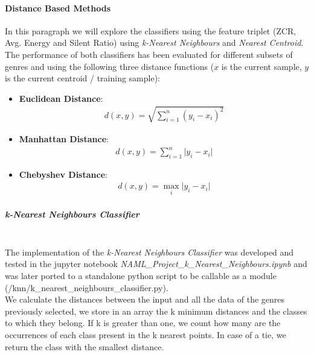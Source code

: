 \documentclass[12pt]{article}
\begin{document}
	\paragraph{Distance Based Methods}
	In this paragraph we will explore the classifiers using the feature triplet (ZCR, Avg. Energy and Silent Ratio) using \textit{k-Nearest Neighbours} and \textit{Nearest Centroid}. The performance of both classifiers has been evaluated for different subsets of genres and using the following three distance functions ($\mathit{x}$ is the current sample, $\mathit{y}$ is the current centroid / training sample):
	\begin{itemize}
		\item \textbf{Euclidean Distance}:\\
		\begin{align}
			d(x,y)=\sqrt{\sum_{i=1}^n{(y_i-x_i)^2}}
		\end{align}
		\item \textbf{Manhattan Distance}:\\
		\begin{align}
			d(x,y)=\sum_{i=1}^n{\big|y_i-x_i\big|}
		\end{align}
		\item \textbf{Chebyshev Distance}:\\
		\begin{align}
			d(x,y)=\max_i{\big|y_i-x_i\big|}
		\end{align}
	\end{itemize}
	\mbox{}\newpage
	\subparagraph{k-Nearest Neighbours Classifier}\mbox{}\\\newline
	The implementation of the \textit{k-Nearest Neighbours Classifier} was developed and tested in the jupyter notebook \textit{NAML\_Project\_k\_Nearest\_Neighbours.ipynb} and was later ported to a standalone python script to be callable as a module (/knn/k\_nearest\_neighbours\_classifier.py).\\
	We calculate the distances between the input and all the data of the genres previously selected, we store in an array the k minimum distances and the classes to which they belong. If k is greater than one, we count how many are the occurrences of each class present in the k nearest points. In case of a tie, we return the class with the smallest distance.
\end{document}
